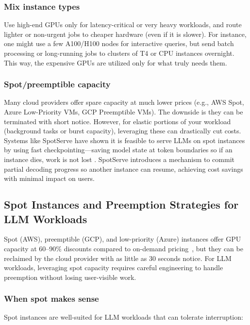\subsubsection{Mix instance types}
Use high-end GPUs only for latency-critical or very heavy workloads, and route lighter or non-urgent jobs to cheaper hardware (even if it is slower). For instance, one might use a few A100/H100 nodes for interactive queries, but send batch processing or long-running jobs to clusters of T4 or CPU instances overnight. This way, the expensive GPUs are utilized only for what truly needs them.

\subsubsection{Spot/preemptible capacity}
Many cloud providers offer spare capacity at much lower prices (e.g., AWS Spot, Azure Low-Priority VMs, GCP Preemptible VMs). The downside is they can be terminated with short notice. However, for elastic portions of your workload (background tasks or burst capacity), leveraging these can drastically cut costs. Systems like SpotServe have shown it is feasible to serve LLMs on spot instances by using fast checkpointing---saving model state at token boundaries so if an instance dies, work is not lost \cite{pope2023exegpt}. SpotServe introduces a mechanism to commit partial decoding progress so another instance can resume, achieving cost savings with minimal impact on users.

\subsection{Spot Instances and Preemption Strategies for LLM Workloads}
\label{subsec:ch06-spot-instances}

Spot (AWS), preemptible (GCP), and low-priority (Azure) instances offer GPU capacity at 60--90\% discounts compared to on-demand pricing~\cite{spot-capacity}, but they can be reclaimed by the cloud provider with as little as 30 seconds notice. For LLM workloads, leveraging spot capacity requires careful engineering to handle preemption without losing user-visible work.

\subsubsection{When spot makes sense}
Spot instances are well-suited for LLM workloads that can tolerate interruption:

